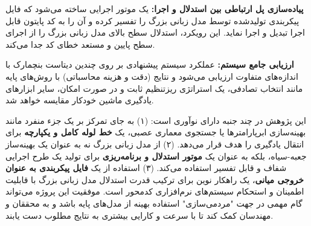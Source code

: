 \textbf{پیاده‌سازی پل ارتباطی بین استدلال و اجرا:} یک موتور اجرایی ساخته می‌شود که فایل پیکربندی تولیدشده توسط مدل زبانی بزرگ را تفسیر کرده و آن را به کد پایتون قابل اجرا تبدیل و اجرا نماید. این رویکرد، استدلال سطح بالای مدل زبانی بزرگ را از اجرای سطح پایین و مستعد خطای کد جدا می‌کند.

\textbf{ارزیابی جامع سیستم:} عملکرد سیستم پیشنهادی بر روی چندین دیتاست بنچمارک با اندازه‌های متفاوت ارزیابی می‌شود و نتایج (دقت و هزینه محاسباتی) با روش‌های پایه مانند انتخاب تصادفی، یک استراتژی ریزتنظیم ثابت و در صورت امکان، سایر ابزارهای یادگیری ماشین خودکار مقایسه خواهد شد.

این پژوهش در چند جنبه دارای نوآوری است: (۱) به جای تمرکز بر یک جزء منفرد مانند بهینه‌سازی ابرپارامترها یا جستجوی معماری عصبی، یک \textbf{خط لوله کامل و یکپارچه} برای انتقال یادگیری را هدف قرار می‌دهد. (۲) از مدل زبانی بزرگ نه به عنوان یک بهینه‌ساز جعبه-سیاه، بلکه به عنوان یک \textbf{موتور استدلال و برنامه‌ریزی} برای تولید یک طرح اجرایی شفاف و قابل تفسیر استفاده می‌کند. (۳) استفاده از یک \textbf{فایل پیکربندی به عنوان خروجی میانی}، یک راهکار نوین برای ترکیب قدرت استدلال مدل زبانی بزرگ با قابلیت اطمینان و استحکام سیستم‌های نرم‌افزاری کدمحور است. موفقیت این پروژه می‌تواند گام مهمی در جهت "مردمی‌سازی" استفاده بهینه از مدل‌های پایه باشد و به محققان و مهندسان کمک کند تا با سرعت و کارایی بیشتری به نتایج مطلوب دست یابند.